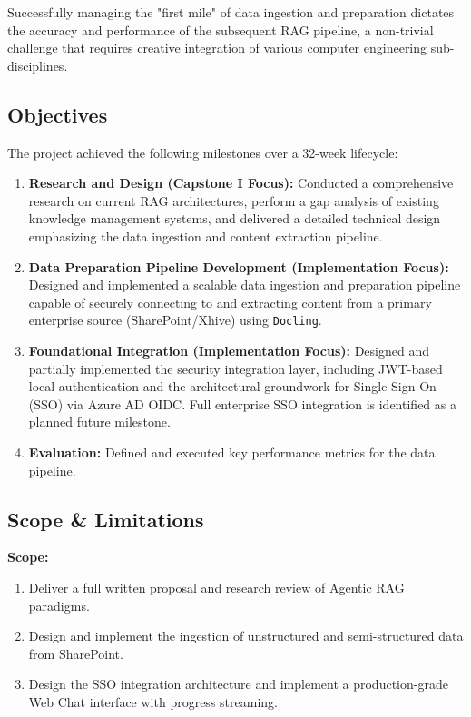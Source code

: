 \documentclass[12pt]{article}
\begin{document}
Successfully managing the "first mile" of data ingestion and preparation dictates the accuracy and performance of the subsequent RAG pipeline, a non-trivial challenge that requires creative integration of various computer engineering sub-disciplines.

\subsection{Objectives}
The project achieved the following milestones over a 32-week lifecycle:
\begin{enumerate}
    \item \textbf{Research and Design (Capstone I Focus):} Conducted a comprehensive research on current RAG architectures, perform a gap analysis of existing knowledge management systems, and delivered a detailed technical design emphasizing the data ingestion and content extraction pipeline.
    \item \textbf{Data Preparation Pipeline Development (Implementation Focus):} Designed and implemented a scalable data ingestion and preparation pipeline capable of securely connecting to and extracting content from a primary enterprise source (SharePoint/Xhive) using \texttt{Docling}.
    \item \textbf{Foundational Integration (Implementation Focus):} Designed and partially implemented the security integration layer, including JWT-based local authentication and the architectural groundwork for Single Sign-On (SSO) via Azure AD OIDC. Full enterprise SSO integration is identified as a planned future milestone.
    \item \textbf{Evaluation:} Defined and executed key performance metrics for the data pipeline.
\end{enumerate}

\subsection{Scope \& Limitations}
\textbf{Scope:}
\begin{enumerate}
    \item Deliver a full written proposal and research review of Agentic RAG paradigms.
    \item Design and implement the ingestion of unstructured and semi-structured data from SharePoint.
    \item Design the SSO integration architecture and implement a production-grade Web Chat interface with progress streaming.
\end{enumerate}
\end{document}
